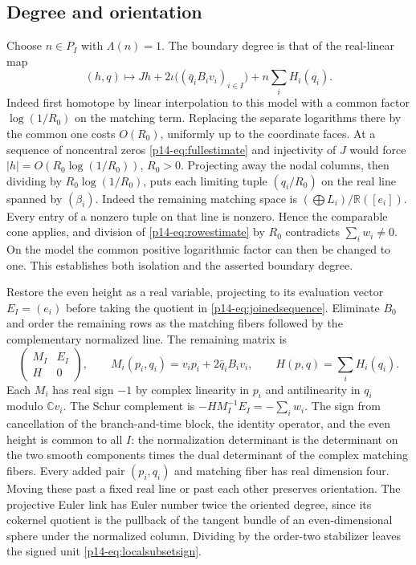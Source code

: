 \subsection{Degree and orientation}
Choose $n\in P_I$ with $\Lambda(n)=1$. The boundary degree is that
of the real-linear map
\begin{equation}\label{p14-eq:linearjoin}
 (h,q)\longmapsto Jh+2\iota\big((\bar q_iB_i v_i)_{i\in I}\big)
                                      +n\sum_i H_i(q_i).
\end{equation}
Indeed first homotope by linear interpolation to this model with a
common factor $\log(1/R_0)$ on the matching term. Replacing the separate
logarithms there by the common one costs $O(R_0)$, uniformly up to
the coordinate faces. At a sequence of noncentral zeros
\eqref{p14-eq:fullestimate} and injectivity of $J$ would force
$|h|=O(R_0\log(1/R_0))$, $R_0>0$. Projecting away the nodal
columns, then dividing by $R_0\log(1/R_0)$, puts each limiting
tuple $(q_i/R_0)$ on the real line spanned by $(\beta_i)$. Indeed
the remaining matching space is $(\bigoplus L_i)/\mathbb R([e_i])$.
Every entry of a nonzero tuple on that line is nonzero. Hence the
comparable cone applies, and division of \eqref{p14-eq:rowestimate}
by $R_0$ contradicts $\sum_i w_i\ne0$. On the model the common
positive logarithmic factor can then be changed to one. This
establishes both isolation and the asserted boundary degree.

Restore the even height as a real variable, projecting to its
evaluation vector $E_I=(e_i)$ before taking the quotient in
\eqref{p14-eq:joinedsequence}. Eliminate $B_0$ and order the remaining
rows as the matching fibers followed by the complementary normalized
line. The remaining matrix is
\[
 \begin{pmatrix}M_I&E_I\\ H&0\end{pmatrix},\qquad
 M_i(p_i,q_i)=v_i p_i+2\bar q_i B_i v_i,\qquad
 H(p,q)=\sum_i H_i(q_i).
\]
Each $M_i$ has real sign $-1$ by complex linearity in $p_i$ and
antilinearity in $q_i$ modulo $\mathbb Cv_i$. The Schur complement is
$-H M_I^{-1}E_I=-\sum_iw_i$. The sign from cancellation of the
branch-and-time block, the identity operator, and the even height is
common to all $I$: the normalization determinant is the determinant
on the two smooth components times the dual determinant of the
complex matching fibers. Every added pair $(p_i,q_i)$ and matching
fiber has real dimension four. Moving these past a fixed real line
or past each other preserves orientation. The projective Euler link
has Euler number twice the oriented degree, since its cokernel
quotient is the pullback of the tangent bundle of an even-dimensional
sphere under the normalized column. Dividing by the order-two
stabilizer leaves the signed unit \eqref{p14-eq:localsubsetsign}.


